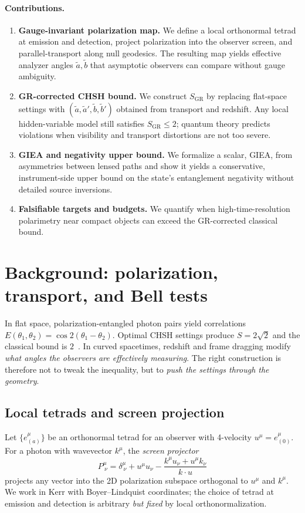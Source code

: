 \documentclass[11pt]{article}
\begin{document}
\paragraph{Contributions.}
\begin{enumerate}
  \item \textbf{Gauge-invariant polarization map.} We define a local orthonormal tetrad at emission and detection, project polarization into the observer screen, and parallel-transport along null geodesics. The resulting map yields effective analyzer angles \(\tilde a,\tilde b\) that asymptotic observers can compare without gauge ambiguity.
  \item \textbf{GR-corrected CHSH bound.} We construct \(S_{\mathrm{GR}}\) by replacing flat-space settings with \((\tilde a,\tilde a',\tilde b,\tilde b')\) obtained from transport and redshift. Any local hidden-variable model still satisfies \(S_{\mathrm{GR}}\le 2\); quantum theory predicts violations when visibility and transport distortions are not too severe.
  \item \textbf{GIEA and negativity upper bound.} We formalize a scalar, GIEA, from asymmetries between lensed paths and show it yields a conservative, instrument-side upper bound on the state's entanglement negativity without detailed source inversions.
  \item \textbf{Falsifiable targets and budgets.} We quantify when high-time-resolution polarimetry near compact objects can exceed the GR-corrected classical bound.
\end{enumerate}

\section{Background: polarization, transport, and Bell tests}
In flat space, polarization-entangled photon pairs yield correlations \(E(\theta_1,\theta_2)=\cos 2(\theta_1-\theta_2)\). Optimal CHSH settings produce \(S=2\sqrt 2\) and the classical bound is \(2\)~\cite{CHSH1969,FreedmanClauser1972,KocherCommins1967}. In curved spacetimes, redshift and frame dragging modify \emph{what angles the observers are effectively measuring}. The right construction is therefore not to tweak the inequality, but to \emph{push the settings through the geometry}.

\subsection{Local tetrads and screen projection}
Let \(\{e_{(a)}^\mu\}\) be an orthonormal tetrad for an observer with 4-velocity \(u^\mu=e_{(0)}^\mu\). For a photon with wavevector \(k^\mu\), the \emph{screen projector}
\begin{equation}
  P^\mu_{\ \nu} = \delta^\mu_{\ \nu} + u^\mu u_\nu - \frac{k^\mu u_\nu + u^\mu k_\nu}{k\cdot u}
\end{equation}
projects any vector into the 2D polarization subspace orthogonal to \(u^\mu\) and \(k^\mu\). We work in Kerr with Boyer--Lindquist coordinates; the choice of tetrad at emission and detection is arbitrary \emph{but fixed} by local orthonormalization.
\end{document}
